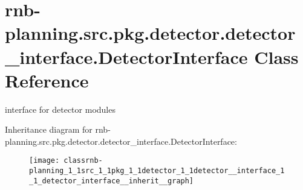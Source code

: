 \hypertarget{classrnb-planning_1_1src_1_1pkg_1_1detector_1_1detector__interface_1_1_detector_interface}{}\section{rnb-\/planning.src.\+pkg.\+detector.\+detector\+\_\+interface.\+Detector\+Interface Class Reference}
\label{classrnb-planning_1_1src_1_1pkg_1_1detector_1_1detector__interface_1_1_detector_interface}


interface for detector modules  




Inheritance diagram for rnb-\/planning.src.\+pkg.\+detector.\+detector\+\_\+interface.\+Detector\+Interface\+:
\nopagebreak
\begin{figure}[H]
\begin{center}
\leavevmode
\texttt{[image: classrnb-planning\_1\_1src\_1\_1pkg\_1\_1detector\_1\_1detector\_\_interface\_1\_1\_detector\_interface\_\_inherit\_\_graph]}
\end{center}
\end{figure}
